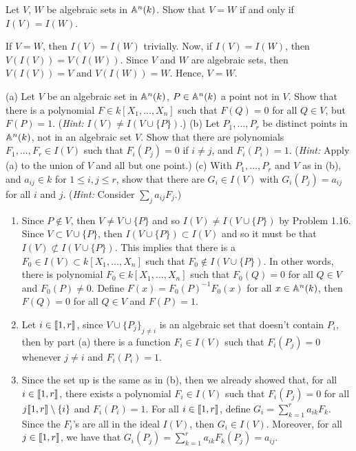 \begin{exercise}
    Let $V$, $W$ be algebraic sets in $\mathbb{A}^n(k)$. Show that $V = W$ if and only if $I(V) = I(W)$. \\
\end{exercise}

\begin{solution}
    If $V = W$, then $I(V) = I(W)$ trivially. Now, if $I(V) = I(W)$, then $V(I(V)) = V(I(W))$. Since $V$ and $W$ are algebraic sets, then $V(I(V)) = V$ and $V(I(W)) = W$. Hence, $V = W$. \\
\end{solution}

\begin{exercise}
    (a) Let $V$ be an algebraic set in $\mathbb{A}^n(k)$, $P \in \mathbb{A}^n(k)$ a point not in $V$. Show that there is a polynomial $F \in k[X_1, ..., X_n]$ such that $F(Q) = 0$ for all $Q \in V$, but $F(P) = 1$. (\textit{Hint:} $I(V) \neq I(V\cup \{P\})$.) (b) Let $P_1, ..., P_r$ be distinct points in $\mathbb{A}^n(k)$, not in an algebraic set $V$. Show that there are polynomials $F_1, ..., F_r \in I(V)$ such that $F_i(P_j) = 0$ if $i \neq j$, and $F_i(P_i) = 1$. (\textit{Hint:} Apply (a) to the union of $V$ and all but one point.) (c) With $P_1, ..., P_r$ and $V$ as in (b), and $a_{ij} \in k$ for $1 \leq i,j \leq r$, show that there are $G_i \in I(V)$ with $G_i(P_j) = a_{ij}$ for all $i$ and $j$. (\textit{Hint:} Consider $\sum_ja_{ij}F_j$.) \\
\end{exercise}

\begin{solution}
    \begin{enumerate}[label=(\alph*)]
        \item Since $P \notin V$, then $V \neq V\cup \{P\}$ and so $I(V) \neq I(V\cup \{P\})$ by Problem 1.16. Since $V \subset V \cup \{P\}$, then $I(V \cup \{P\}) \subset I(V)$ and so it must be that $I(V) \not\subset I(V \cup \{P\})$. This implies that there is a $F_0 \in I(V) \subset k[X_1, ..., X_n]$ such that $F_0 \notin I(V \cup \{P\})$. In other words, there is polynomial $F_0 \in k[X_1, ..., X_n]$ such that $F_0(Q) = 0$ for all $Q\in V$ and $F_0(P) \neq 0$. Define $F(x) = F_0(P)^{-1}F_0(x)$ for all $x \in \mathbb{A}^n(k)$, then $F(Q) = 0$ for all $Q \in V$ and $F(P) = 1$.
        \item Let $i\in \llbracket 1 , r \rrbracket$, since $V \cup \{P_j\}_{j \neq i}$ is an algebraic set that doesn't contain $P_i$, then by part (a) there is a function $F_i \in I(V)$ such that $F_i(P_j) = 0$ whenever $j \neq i$ and $F_i(P_i) = 1$. 
        \item Since the set up is the same as in (b), then we already showed that, for all $i \in \llbracket 1 , r \rrbracket$, there exists a polynomial $F_i \in I(V)$ such that $F_i(P_j) = 0$ for all $j \llbracket 1 , r \rrbracket \setminus\{i\}$ and $F_i(P_i) = 1$. For all $i \in \llbracket 1 , r \rrbracket$, define $G_i = \sum_{k=1}^{r}a_{ik}F_k$. Since the $F_i$'s are all in the ideal $I(V)$, then $G_i \in I(V)$. Moreover, for all $j \in \llbracket 1 , r \rrbracket$, we have that $G_i(P_j) = \sum_{k=1}^{r}a_{ik}F_k(P_j) = a_{ij}$. \\
    \end{enumerate}
\end{solution}

